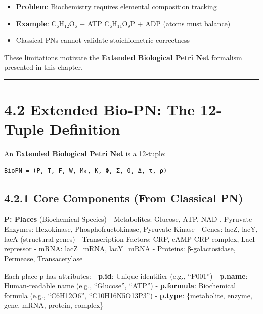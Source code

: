 \begin{enumerate}
  \begin{itemize}
  \tightlist
  \item
    \textbf{Problem}: Biochemistry requires elemental composition
    tracking
  \item
    \textbf{Example}: C₆H₁₂O₆ + ATP \textrightarrow C₆H₁₁O₉P + ADP (atoms must
    balance)
  \item
    Classical PNs cannot validate stoichiometric correctness
  \end{itemize}
\end{enumerate}

These limitations motivate the \textbf{Extended Biological Petri Net}
formalism presented in this chapter.

\begin{center}\rule{0.5\linewidth}{0.5pt}\end{center}

\hypertarget{extended-bio-pn-the-12-tuple-definition}{%
\section{4.2 Extended Bio-PN: The 12-Tuple
Definition}\label{extended-bio-pn-the-12-tuple-definition}}

An \textbf{Extended Biological Petri Net} is a 12-tuple:

\begin{lstlisting}
BioPN = (P, T, F, W, M₀, K, Φ, Σ, Θ, Δ, τ, ρ)
\end{lstlisting}

\hypertarget{core-components-from-classical-pn}{%
\subsection{4.2.1 Core Components (From Classical
PN)}\label{core-components-from-classical-pn}}

\textbf{P: Places} (Biochemical Species) - Metabolites: Glucose, ATP,
NAD⁺, Pyruvate - Enzymes: Hexokinase, Phosphofructokinase, Pyruvate
Kinase - Genes: lacZ, lacY, lacA (structural genes) - Transcription
Factors: CRP, cAMP-CRP complex, LacI repressor - mRNA: lacZ\_mRNA,
lacY\_mRNA - Proteins: β-galactosidase, Permease, Transacetylase

Each place p has attributes: - \textbf{p.id}: Unique identifier (e.g.,
``P001'') - \textbf{p.name}: Human-readable name (e.g., ``Glucose'',
``ATP'') - \textbf{p.formula}: Biochemical formula (e.g., ``C6H12O6'',
``C10H16N5O13P3'') - \textbf{p.type}: \{metabolite, enzyme, gene, mRNA,
protein, complex\}

